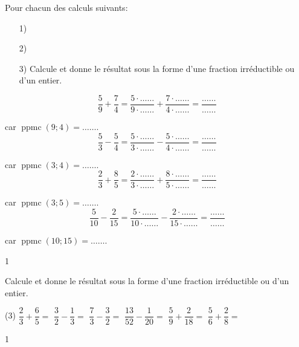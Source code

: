 \documentclass[a4paper,11pt]{report}
\begin{document}
\begin{exop}
{Pour chacun des calculs suivants:
	\begin{enumerate}
    \item[1)] 
    \item[2)] 
    \item[3)] {\text Calcule et donne le résultat sous la forme d'une fraction irréductible ou
    d'un entier.}
\end{enumerate}
\vspace{3pt}

\begin{tasks}
	\task \[\dfrac{5}{9}+\dfrac{7}{4}=\dfrac{5\cdot\ldots\ldots}{9\cdot\ldots\ldots}+\dfrac{7\cdot \ldots\ldots}{4\cdot \ldots\ldots}=\dfrac{\ldots\ldots}{\ldots\ldots}\]
		\vspace{3pt}

	car $\operatorname{ppmc}(9;4)=\ldots\ldots$.
	\task \[\dfrac{5}{3}-\dfrac{5}{4}=\dfrac{5\cdot\ldots\ldots}{3\cdot\ldots\ldots}-\dfrac{5\cdot \ldots\ldots}{4\cdot \ldots\ldots}=\dfrac{\ldots\ldots}{\ldots\ldots}\]
		\vspace{3pt}

	car $\operatorname{ppmc}(3;4)=\ldots\ldots$.
	\task \[\dfrac{2}{3}+\dfrac{8}{5}=\dfrac{2\cdot\ldots\ldots}{3\cdot\ldots\ldots}+\dfrac{8\cdot \ldots\ldots}{5\cdot \ldots\ldots}=\dfrac{\ldots\ldots}{\ldots\ldots}\]
		\vspace{3pt}

	car $\operatorname{ppmc}(3;5)=\ldots\ldots$.
	\task \[\dfrac{5}{10}-\dfrac{2}{15}=\dfrac{5\cdot\ldots\ldots}{10\cdot\ldots\ldots}-\dfrac{2\cdot \ldots\ldots}{15\cdot \ldots\ldots}=\dfrac{\ldots\ldots}{\ldots\ldots}\]
		\vspace{3pt}

	car $\operatorname{ppmc}(10;15)=\ldots\ldots$.
\end{tasks}}
{1}
\end{exop}



\begin{exo}
{Calcule et donne le résultat sous la forme d'une fraction irréductible ou d'un entier.
\begin{tasks}(3)
\task $\dfrac{2}{3}+\dfrac{6}{5}=$
\task $\dfrac{3}{2}-\dfrac{1}{3}=$
\task $\dfrac{7}{3}-\dfrac{3}{2}=$
\task $\dfrac{13}{52}-\dfrac{1}{20}=$
\task $\dfrac{5}{9}+\dfrac{2}{18}=$
\task $\dfrac{5}{6}+\dfrac{2}{8}=$
\end{tasks}    
}{1}
\end{exo}
\end{document}
